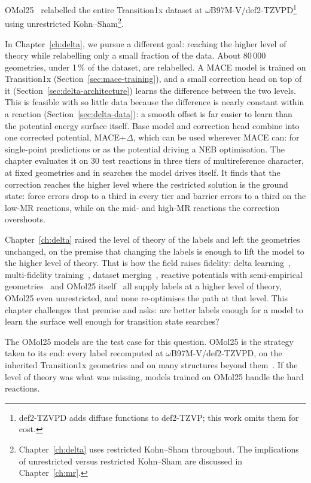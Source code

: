 OMol25~\cite{omol25} relabelled the entire Transition1x dataset at
\mbox{$\omega$B97M-V/def2-TZVPD}\footnote{def2-TZVPD adds diffuse
functions to def2-TZVP; this work omits them for cost.} using
unrestricted Kohn--Sham\footnote{Chapter~\ref{ch:delta} uses restricted
Kohn--Sham throughout. The implications of unrestricted versus
restricted Kohn--Sham are discussed in Chapter~\ref{ch:mr}.}.

In Chapter~\ref{ch:delta}, we pursue a different goal: reaching the
higher level of theory while relabelling only a small fraction of the
data. About 80\,000 geometries, under 1\,\% of the dataset, are
relabelled. A MACE model is trained on Transition1x
(Section~\ref{sec:mace-training}), and a small correction head on top
of it (Section~\ref{sec:delta-architecture}) learns the difference
between the two levels. This is feasible with so little data because
the difference is nearly constant within a reaction
(Section~\ref{sec:delta-data}): a smooth offset is far easier to learn
than the potential energy surface itself. Base model and correction
head combine into one corrected potential, MACE+$\Delta$, which can be
used wherever MACE can: for single-point predictions or as the
potential driving a NEB optimisation. The chapter evaluates it on 30
test reactions in three tiers of multireference character, at fixed
geometries and in searches the model drives itself. It finds that the
correction reaches the higher level where the restricted solution is
the ground state: force errors drop to a third in every tier and
barrier errors to a third on the low-MR reactions, while on the mid-
and high-MR reactions the correction overshoots.


Chapter~\ref{ch:delta} raised the level of theory of the labels and left
the geometries unchanged, on the premise that changing the labels is
enough to lift the model to the higher level of theory. That is how the
field raises fidelity: delta learning~\cite{ramakrishnan2015},
multi-fidelity training~\cite{messerly2025}, dataset
merging~\cite{shiota2024}, reactive potentials with semi-empirical
geometries~\cite{ren2026} and OMol25 itself~\cite{omol25} all supply
labels at a higher level of theory, OMol25 even unrestricted, and none
re-optimises the path at that level. This chapter challenges that
premise and asks: are better labels enough for a model to learn the
surface well enough for transition state searches?

The OMol25 models are the test case for this question. OMol25 is the
strategy taken to its end: every label recomputed at
\mbox{$\omega$B97M-V/def2-TZVPD}, on the inherited Transition1x
geometries and on many structures beyond them~\cite{omol25}. If the
level of theory was what was missing, models trained on OMol25 handle
the hard reactions.


